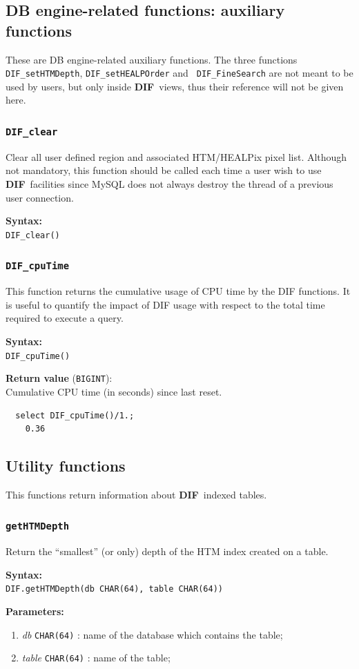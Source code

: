 \documentclass[10pt,titlepage]{article}
\newcommand{\dif}{\textbf{\small DIF}}
\newcommand{\syntax}[1]
{
  \bigskip
  \noindent
  \textbf{Syntax:} \\ 
  \indent \texttt{#1}
}
\newenvironment{parameters}
{
  \medskip
  \noindent
  \textbf{Parameters:}
  \begin{enumerate}
}
{
  \end{enumerate}
}
\newcommand{\param}[2]
{
  \item \textit{#1} \texttt{#2} 
}
\newcommand{\return}[1]
{
  \medskip
  \noindent
  \textbf{Return value} (\texttt{#1}): \\
  \indent
}
\newcommand{\example}
{
\medskip
\noindent{\textbf{Example:}}
}
\begin{document}
%
%
\subsection{DB engine-related functions: auxiliary functions}
These are DB engine-related auxiliary functions. The three functions
{\tt DIF\_setHTMDepth}, {\tt DIF\_setHEALPOrder} and {\tt
  DIF\_FineSearch} are not meant to be used by users, but only inside
\dif\ views, thus their reference will not be given here.


\subsubsection{{\tt DIF\_clear}}
Clear all user defined region and associated HTM/HEALPix pixel
list. Although not mandatory, this function should be called each time
a user wish to use \dif\ facilities since MySQL does not always destroy
the thread of a previous user connection. 

\syntax{DIF\_clear()}
%
%

\subsubsection{{\tt DIF\_cpuTime}}
This function returns the cumulative usage of CPU time by the DIF functions.
It is useful to quantify the impact of DIF usage with respect to the total
time required to execute a query.

\syntax{DIF\_cpuTime()}

\return{BIGINT} Cumulative CPU time (in seconds) since last reset.

\example
%
\begin{verbatim}
  select DIF_cpuTime()/1.;
    0.36
\end{verbatim}
%
%

\subsection{Utility functions}
This functions return information about \dif\ indexed tables. 
%

\subsubsection{{\tt getHTMDepth}}
Return the ``smallest'' (or only) depth of the HTM index created on a table.

\syntax{DIF.getHTMDepth(db CHAR(64), table CHAR(64))}

\begin{parameters}
  \param{db}{CHAR(64)}: name of the database which contains the table;
  \param{table}{CHAR(64)}: name of the table;
\end{parameters}
\end{document}
